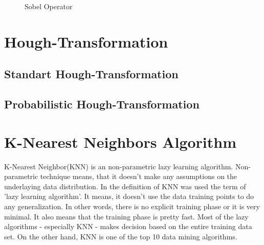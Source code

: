 \begin{figure}[H]
  \centering
  \hfill
  \caption{Sobel Operator\cite{Sobel_Operator}}
\end{figure}




%
\section{Hough-Transformation}\label{sec:Hough-Transformation}
%

%
\subsection{Standart Hough-Transformation}\label{sec:Standart Hough - Transformation}
%


%
\subsection{Probabilistic Hough-Transformation}\label{sec:Probabilistic Hough-Transformation}
%




%
\section{K-Nearest Neighbors Algorithm}\label{sec:K-Nearest Neighbors Algorithm}
%
K-Nearest Neighbor(KNN) is an non-parametric lazy learning algorithm. Non-parametric technique means, that it doesn't make any assumptions on the underlaying data distribution. In the definition of KNN was used the term of 'lazy learning algorithm'. It means, it doesn't use the data training points to do any generalization. In other words, there is no explicit training phase or it is very minimal.  It also means that the training phase is pretty fast. Most of the lazy algorithms - especially KNN - makes decision based on the entire training data set. On the other hand, KNN is one of the top 10 data mining algorithms\cite{k_nearest_neighbors}.

